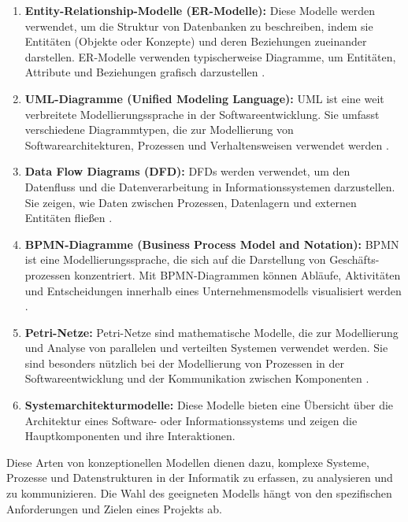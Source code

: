 \begin{enumerate}
    \item \textbf{Entity-Relationship-Modelle (ER-Modelle):} Diese Modelle werden verwendet, um die Struktur von Datenbanken zu beschreiben, indem sie Entitäten (Objekte oder Konzepte) und deren Beziehungen zueinander darstellen. ER-Modelle verwenden typischerweise Diagramme, um Entitäten, Attribute und Beziehungen grafisch darzustellen \cite{gregersen1999temporal}.
    
    \item \textbf{UML-Diagramme (Unified Modeling Language):} UML ist eine weit verbreitete Modellierungssprache in der Softwareentwicklung. Sie umfasst verschiedene Diagrammtypen, die zur Modellierung von Softwarearchitekturen, Prozessen und Verhaltensweisen verwendet werden \cite{reggio2013used}. 
    
    \item \textbf{Data Flow Diagrams (DFD):} DFDs werden verwendet, um den Datenfluss und die Datenverarbeitung in Informationssystemen darzustellen. Sie zeigen, wie Daten zwischen Prozessen, Datenlagern und externen Entitäten fließen \cite{li2009data}.
    
    \item \textbf{BPMN-Diagramme (Business Process Model and Notation):} BPMN ist eine Modellierungssprache, die sich auf die Darstellung von Geschäfts-prozessen konzentriert. Mit BPMN-Diagrammen können Abläufe, Aktivitäten und Entscheidungen innerhalb eines Unternehmensmodells visualisiert werden \cite{white2004introduction}.
    
    \item \textbf{Petri-Netze:} Petri-Netze sind mathematische Modelle, die zur Modellierung und Analyse von parallelen und verteilten Systemen verwendet werden. Sie sind besonders nützlich bei der Modellierung von Prozessen in der Softwareentwicklung und der Kommunikation zwischen Komponenten \cite{petri2008petri}.
    \item \textbf{Systemarchitekturmodelle:} Diese Modelle bieten eine Übersicht über die Architektur eines Software- oder Informationssystems und zeigen die Hauptkomponenten und ihre Interaktionen.
\end{enumerate}

Diese Arten von konzeptionellen Modellen dienen dazu, komplexe Systeme, Prozesse und Datenstrukturen in der Informatik zu erfassen, zu analysieren und zu kommunizieren. Die Wahl des geeigneten Modells hängt von den spezifischen Anforderungen und Zielen eines Projekts ab. 

